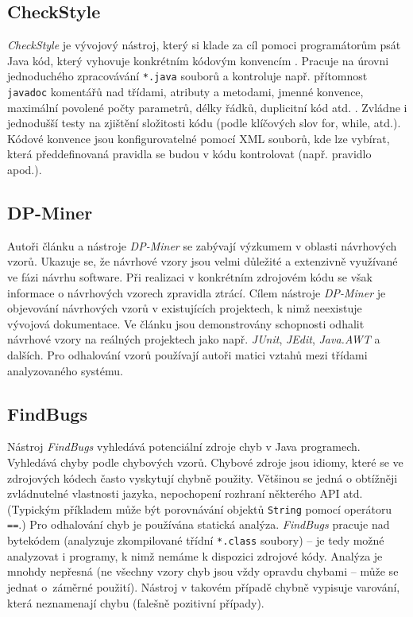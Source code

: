 \subsection{CheckStyle}
\emph{CheckStyle} je vývojový nástroj, který si klade za cíl pomoci programátorům psát Java kód, který vyhovuje konkrétním kódovým konvencím \cite{existingtools:checkstyle}. Pracuje na úrovni jednoduchého zpracovávání \verb+*.java+ souborů a kontroluje např. přítomnost \verb+javadoc+ komentářů nad třídami, atributy a metodami, jmenné konvence, maximální povolené počty parametrů, délky řádků, duplicitní kód atd. \cite{existingtools:checkstyle-wiki}. Zvládne i jednodušší testy na zjištění složitosti kódu (podle klíčových slov for, while, atd.). Kódové konvence jsou konfigurovatelné pomocí XML souborů, kde lze vybírat, která předdefinovaná pravidla se budou v kódu kontrolovat (např. pravidlo \mbox{} apod.).

\subsection{DP-Miner}
Autoři článku \cite{4273268} a nástroje \emph{DP-Miner} \cite{existingtools:dp-miner} se zabývají výzkumem v oblasti návrhových vzorů. Ukazuje se, že návrhové vzory jsou velmi důležité a extenzivně využívané ve fázi návrhu software. Při realizaci v konkrétním zdrojovém kódu se však informace o návrhových vzorech zpravidla ztrácí. Cílem nástroje \emph{DP-Miner} je objevování návrhových vzorů v existujících projektech, k nimž neexistuje vývojová dokumentace. Ve článku \cite{4273268} jsou demonstrovány schopnosti odhalit návrhové vzory na reálných projektech jako např. \emph{JUnit}, \emph{JEdit}, \emph{Java.AWT} a dalších. Pro odhalování vzorů používají autoři matici vztahů mezi třídami analyzovaného systému.

\subsection{FindBugs}
Nástroj \emph{FindBugs} \cite{existingtools:findbugs} vyhledává potenciální zdroje chyb v Java programech. Vyhledává chyby podle chybových vzorů. Chybové zdroje jsou idiomy, které se ve zdrojových kódech často vyskytují chybně použity. Většinou se jedná o obtížněji zvládnutelné vlastnosti jazyka, nepochopení rozhraní některého API atd. (Typickým příkladem může být porovnávání objektů \verb+String+ pomocí operátoru \verb+==+.) Pro odhalování chyb je používána statická analýza. \emph{FindBugs} pracuje nad bytekódem (analyzuje zkompilované třídní \verb-*.class- soubory) -- je tedy možné analyzovat i programy, k nimž nemáme k dispozici zdrojové kódy. Analýza je mnohdy nepřesná (ne všechny vzory chyb jsou vždy opravdu chybami -- může se jednat o~záměrné použití). Nástroj v takovém případě chybně vypisuje varování, která neznamenají chybu (falešně pozitivní případy).

